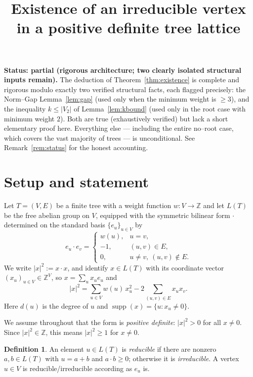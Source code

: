 \documentclass{article}
\newcommand{\bZ}{\mathbb{Z}}
\newcommand{\supp}{\operatorname{supp}}
\theoremstyle{definition}
\newtheorem{definition}{Definition}
\begin{document}
\noindent\textbf{Status: partial (rigorous architecture; two clearly isolated
structural inputs remain).}  The deduction of Theorem~\ref{thm:existence} is
complete and rigorous modulo exactly two verified structural facts, each flagged
precisely: the Norm--Gap Lemma~\ref{lem:gap} (used only when the minimum weight
is $\geq 3$), and the inequality $k\leq|V_2|$ of Lemma~\ref{lem:kbound} (used
only in the root case with minimum weight $2$).  Both are true (exhaustively
verified) but lack a short elementary proof here.  Everything else --- including
the entire no--root case, which covers the vast majority of trees --- is
unconditional.  See Remark~\ref{rem:status} for the honest accounting.

\title{Existence of an irreducible vertex in a positive definite tree lattice}
\author{}
\date{}
\maketitle

\section{Setup and statement}

Let $T=(V,E)$ be a finite tree with a weight function $w:V\to\bZ$ and let
$L(T)$ be the free abelian group on $V$, equipped with the symmetric bilinear
form $\cdot$ determined on the standard basis $\{e_u\}_{u\in V}$ by
\[
e_u\cdot e_v=
\begin{cases}
w(u),& u=v,\\
-1,& (u,v)\in E,\\
0,& u\neq v,\ (u,v)\notin E.
\end{cases}
\]
We write $|x|^2:=x\cdot x$, and identify $x\in L(T)$ with its coordinate vector
$(x_u)_{u\in V}\in\bZ^V$, so $x=\sum_u x_u e_u$ and
\begin{equation}\label{eq:normexpand}
|x|^2=\sum_{u\in V}w(u)\,x_u^2-2\sum_{(u,v)\in E}x_u x_v .
\end{equation}
Here $d(u)$ is the degree of $u$ and $\supp(x)=\{u:x_u\neq 0\}$.

We assume throughout that the form is \emph{positive definite}: $|x|^2>0$ for
all $x\neq 0$.  Since $|x|^2\in\bZ$, this means $|x|^2\geq 1$ for $x\neq 0$.

\begin{definition}
An element $u\in L(T)$ is \emph{reducible} if there are nonzero $a,b\in L(T)$
with $u=a+b$ and $a\cdot b\geq 0$; otherwise it is \emph{irreducible}.  A vertex
$u\in V$ is reducible/irreducible according as $e_u$ is.
\end{definition}
\end{document}
